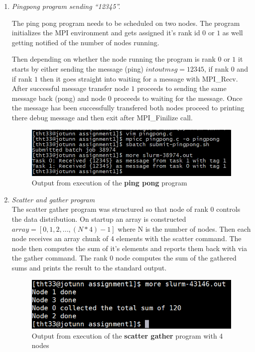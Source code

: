 \documentclass[fontsize=14pt,a4paper]{scrartcl}
\begin{document}
\begin{enumerate}
\begin{enumerate}[label*=\arabic*.]
    \item
    \textit{Pingpong program sending ``12345''.}
    
    The ping pong program needs to be scheduled on two nodes. The program initializes the MPI environment and gets assigned it's rank id $0$ or $1$ as well getting notified of the number of nodes running.

    Then depending on whether the node running the program is rank $0$ or $1$ it starts by either sending the message (ping) $int outmsg=12345$, if rank $0$ and if rank $1$ then it goes straight into waiting for a message with MPI\_Recv. After successful message transfer node $1$ proceeds to sending the same message back (pong) and node $0$ proceeds to waiting for the message. Once the message has been successfully transfered both nodes proceed to printing there debug message and then exit after MPI\_Finilize call.
    \begin{figure}[H]
        \centering
        \includegraphics[scale=0.8]{Images/Pingpong}
        \caption{Output from execution of the \textbf{ping pong} program}
    \end{figure}

    \item
    \textit{Scatter and gather program}\\
    The scatter gather program was structured so that node of rank 0 controls the data distribution. On startup an array is constructed $array = [0, 1, 2, ..., (N * 4) - 1]$ where N is the number of nodes. Then each node receives an array chunk of 4 elements with the scatter command. The node then computes the sum of it’s elements and reports them back with via the gather command. The rank 0 node computes the sum of the gathered sums and prints the result to the standard output.
    \begin{figure}[H]
        \centering
        \includegraphics[scale=0.8]{Images/ScatterGather}
        \caption{Output from execution of the \textbf{scatter gather} program with 4 nodes}
    \end{figure}


\end{enumerate}
\end{enumerate}
\end{document}
